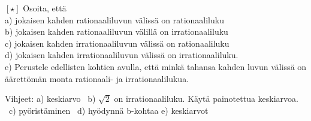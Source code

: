 \begin{tehtavasivu}
\begin{tehtava}
$\boldsymbol{[\star]}$ Osoita, että \\
a) jokaisen kahden rationaaliluvun välissä on rationaaliluku \\
b) jokaisen kahden rationaaliluvun välillä on irrationaaliluku \\
c) jokaisen kahden irrationaaliluvun välissä on rationaaliluku \\
d) jokaisen kahden irrationaaliluvun välissä on irrationaaliluku. \\
e) Perustele edellisten kohtien avulla, että minkä tahansa kahden luvun
välissä on äärettömän monta rationaali- ja irrationaalilukua.
\begin{vastaus}
Vihjeet: a) keskiarvo \ b) $\sqrt{2}$ on irrationaaliluku. Käytä
painotettua keskiarvoa. \ c) pyöristäminen \ d) hyödynnä b-kohtaa
e) keskiarvot
\end{vastaus}
\end{tehtava}

\end{tehtavasivu}
